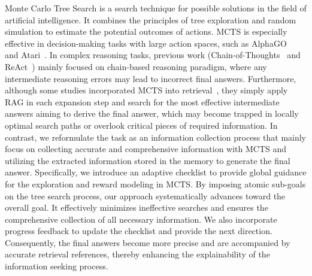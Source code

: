  Monte Carlo Tree Search is a search technique for possible solutions in the field of artificial intelligence. It combines the principles of tree exploration and random simulation to estimate the potential outcomes of actions. MCTS is especially effective in decision-making tasks with large action spaces, such as AlphaGO~\cite{alphago} and Atari~\cite{YeLKAG21}. 
In complex reasoning tasks, previous work (\eg Chain-of-Thoughts~\cite{wei2022chain} and ReAct~\cite{yao2023react}) mainly focused on chain-based reasoning paradigm, where any intermediate reasoning errors may lead to incorrect final answers. Furthermore, although some studies incorporated MCTS into retrieval~\cite{lee2024zero,jiang2024rag}, they simply apply RAG in each expansion step and search for the most effective intermediate answers aiming to derive the final answer, which may become trapped in locally optimal search paths or overlook critical pieces of required information.
In contrast, we reformulate the task as an information collection process that mainly focus on collecting accurate and comprehensive information with MCTS and utilizing the extracted information stored in the memory to generate the final answer. Specifically, we introduce an adaptive checklist to provide global guidance for the exploration and reward modeling in MCTS. By imposing atomic sub-goals on the tree search process, our approach systematically advances toward the overall goal. It effectively minimizes ineffective searches and ensures the comprehensive collection of all necessary information. We also incorporate progress feedback to update the checklist and provide the next direction. Consequently, the final answers become more precise and are accompanied by accurate retrieval references, thereby enhancing the explainability of the information seeking process.



